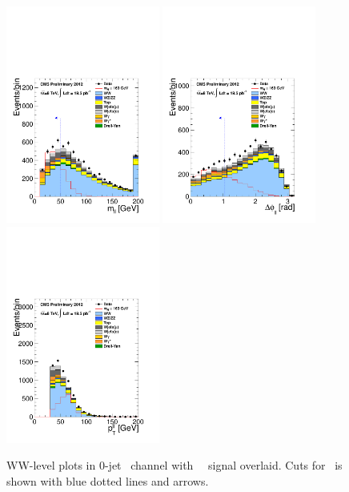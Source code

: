 \begin{figure}[htp]
\includegraphics[width=0.45\textwidth]{figures/hww_analysis16_160_ALL_of_0j_mll.pdf}
\includegraphics[width=0.45\textwidth]{figures/hww_analysis16_160_ALL_of_0j_dphi.pdf}
\includegraphics[width=0.45\textwidth]{figures/hww_analysis16_160_ALL_of_0j_ptll.pdf}
\caption{ WW-level plots in 0-jet \DF\ channel with ~\GeV\ signal overlaid. 
Cuts for \GeV\ is shown with blue dotted lines and arrows. 
}
\label{fig:wwlevelmh160}
\end{figure}

